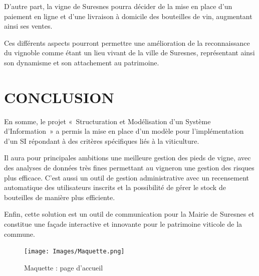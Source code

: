 \documentclass[a4paper, titlepage]{report}
\begin{document}
D'autre part, la vigne de Suresnes pourra décider de la mise en place
d'un paiement en ligne et d'une livraison à domicile des bouteilles de
vin, augmentant ainsi ses ventes.

Ces différents aspects pourront permettre une amélioration de la
reconnaissance du vignoble comme étant un lieu vivant de la ville de
Suresnes, représentant ainsi son dynamisme et son attachement au
patrimoine.


\chapter{CONCLUSION}\label{conclusion}

En somme, le projet «~Structuration et Modélisation d'un Système
d'Information~» a permis la mise en place d'un modèle pour
l'implémentation d'un SI répondant à des critères spécifiques liés à la
viticulture.

Il aura pour principales ambitions une meilleure gestion des pieds de
vigne, avec des analyses de données très fines permettant au vigneron
une gestion des risques plus efficace. C'est aussi un outil de gestion
administrative avec un recensement automatique des utilisateurs inscrits
et la possibilité de gérer le stock de bouteilles de manière plus
efficiente.

Enfin, cette solution est un outil de communication pour la Mairie de
Suresnes et constitue une façade interactive et innovante pour le
patrimoine viticole de la commune.

\clearpage
\begin{figure}[!ht]
\centering
\texttt{[image: Images/Maquette.png]}
\caption{Maquette : page d'accueil}
\end{figure}
\end{document}
